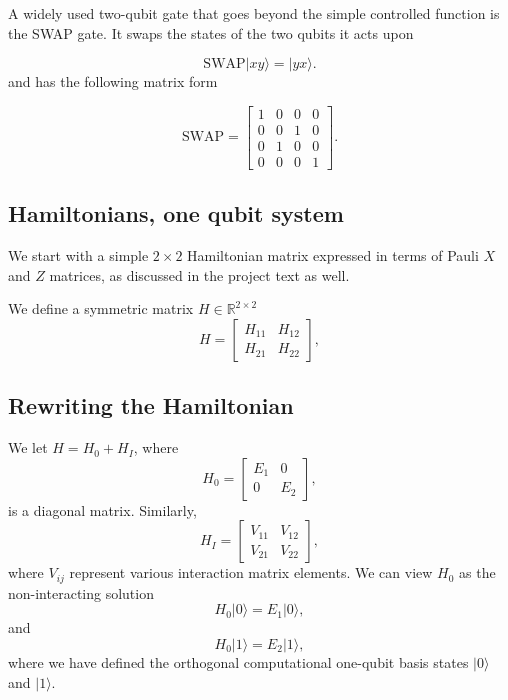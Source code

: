\documentclass[%
oneside,                 %
final,                   %
10pt]{article}
\begin{document}
A widely used two-qubit gate that goes beyond the simple controlled function is the SWAP gate. It swaps the states of the two qubits it acts upon

\[
\mathrm{SWAP}\vert xy\rangle=\vert yx\rangle.
\]
and has the following matrix form

\[
\mathrm{SWAP}
=\begin{bmatrix}
1 & 0 & 0 & 0 \\
0 & 0 & 1 & 0 \\
0 & 1 & 0 & 0 \\
0 & 0 & 0 & 1
\end{bmatrix}.
\]

\subsection{Hamiltonians, one qubit system}

We start with a simple $2\times 2$ Hamiltonian matrix expressed in
terms of Pauli $X$ and $Z$ matrices, as discussed in the project text as well.

We define a  symmetric matrix  $H\in {\mathbb{R}}^{2\times 2}$
\[
H = \begin{bmatrix} H_{11} & H_{12} \\ H_{21} & H_{22}
\end{bmatrix},
\]

\subsection{Rewriting the Hamiltonian}

We  let $H = H_0 + H_I$, where
\[
H_0= \begin{bmatrix} E_1 & 0 \\ 0 & E_2\end{bmatrix},
\]
is a diagonal matrix. Similarly,
\[
H_I= \begin{bmatrix} V_{11} & V_{12} \\ V_{21} & V_{22}\end{bmatrix},
\]
where $V_{ij}$ represent various interaction matrix elements.
We can view $H_0$ as the non-interacting solution
\begin{equation}
       H_0\vert 0 \rangle =E_1\vert 0 \rangle,
\end{equation}
and
\begin{equation}
       H_0\vert 1\rangle =E_2\vert 1\rangle,
\end{equation}
where we have defined the orthogonal computational one-qubit basis states $\vert 0\rangle$ and $\vert 1\rangle$.
\end{document}
